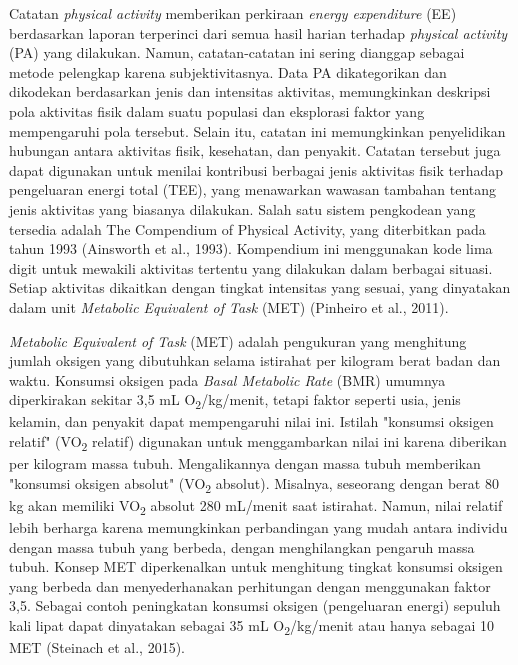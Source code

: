 Catatan \emph{physical activity} memberikan perkiraan \emph{energy expenditure} (EE) berdasarkan laporan terperinci dari semua hasil harian terhadap \emph{physical activity} (PA) yang dilakukan. Namun, catatan-catatan ini sering dianggap sebagai metode pelengkap karena subjektivitasnya. Data PA dikategorikan dan dikodekan berdasarkan jenis dan intensitas aktivitas, memungkinkan deskripsi pola aktivitas fisik dalam suatu populasi dan eksplorasi faktor yang mempengaruhi pola tersebut. Selain itu, catatan ini memungkinkan penyelidikan hubungan antara aktivitas fisik, kesehatan, dan penyakit. Catatan tersebut juga dapat digunakan untuk menilai kontribusi berbagai jenis aktivitas fisik terhadap pengeluaran energi total (TEE), yang menawarkan wawasan tambahan tentang jenis aktivitas yang biasanya dilakukan. Salah satu sistem pengkodean yang tersedia adalah The Compendium of Physical Activity, yang diterbitkan pada tahun 1993 (Ainsworth et al., 1993). Kompendium ini menggunakan kode lima digit untuk mewakili aktivitas tertentu yang dilakukan dalam berbagai situasi. Setiap aktivitas dikaitkan dengan tingkat intensitas yang sesuai, yang dinyatakan dalam unit \emph{Metabolic Equivalent of Task} (MET) (Pinheiro et al., 2011).

\emph{Metabolic Equivalent of Task} (MET) adalah pengukuran yang menghitung jumlah oksigen yang dibutuhkan selama istirahat per kilogram berat badan dan waktu. Konsumsi oksigen pada \emph{Basal Metabolic Rate} (BMR) umumnya diperkirakan sekitar 3,5 mL O\textsubscript{2}/kg/menit, tetapi faktor seperti usia, jenis kelamin, dan penyakit dapat mempengaruhi nilai ini. Istilah "konsumsi oksigen relatif" (VO\textsubscript{2} relatif) digunakan untuk menggambarkan nilai ini karena diberikan per kilogram massa tubuh. Mengalikannya dengan massa tubuh memberikan "konsumsi oksigen absolut" (VO\textsubscript{2} absolut). Misalnya, seseorang dengan berat 80 kg akan memiliki VO\textsubscript{2} absolut 280 mL/menit saat istirahat. Namun, nilai relatif lebih berharga karena memungkinkan perbandingan yang mudah antara individu dengan massa tubuh yang berbeda, dengan menghilangkan pengaruh massa tubuh. Konsep MET diperkenalkan untuk menghitung tingkat konsumsi oksigen yang berbeda dan menyederhanakan perhitungan dengan menggunakan faktor 3,5. Sebagai contoh peningkatan konsumsi oksigen (pengeluaran energi) sepuluh kali lipat dapat dinyatakan sebagai 35 mL O\textsubscript{2}/kg/menit atau hanya sebagai 10 MET (Steinach et al., 2015).

